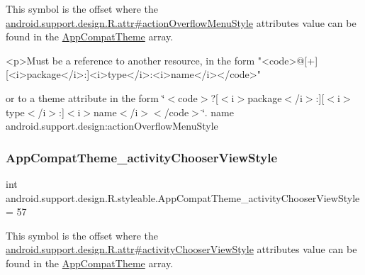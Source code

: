 This symbol is the offset where the \hyperlink{classandroid_1_1support_1_1design_1_1R_1_1attr_a58c4106985af115965681fc784e511f3}{android.\+support.\+design.\+R.\+attr\#action\+Overflow\+Menu\+Style} attribute\textquotesingle{}s value can be found in the \hyperlink{classandroid_1_1support_1_1design_1_1R_1_1styleable_afb351dc8de20cbd4c89abe360373010c}{App\+Compat\+Theme} array.

\begin{DoxyVerb}      <p>Must be a reference to another resource, in the form "<code>@[+][<i>package</i>:]<i>type</i>:<i>name</i></code>"
\end{DoxyVerb}
 or to a theme attribute in the form \char`\"{}$<$code$>$?\mbox{[}$<$i$>$package$<$/i$>$\+:\mbox{]}\mbox{[}$<$i$>$type$<$/i$>$\+:\mbox{]}$<$i$>$name$<$/i$>$$<$/code$>$\char`\"{}.  name android.\+support.\+design\+:action\+Overflow\+Menu\+Style \mbox{\label{classandroid_1_1support_1_1design_1_1R_1_1styleable_acf223883bba2bd20dfcd85b3817e5c51}} 
\subsubsection{\texorpdfstring{App\+Compat\+Theme\+\_\+activity\+Chooser\+View\+Style}{AppCompatTheme\_activityChooserViewStyle}}
{\footnotesize\ttfamily int android.\+support.\+design.\+R.\+styleable.\+App\+Compat\+Theme\+\_\+activity\+Chooser\+View\+Style = 57\hspace{0.3cm}{\ttfamily [static]}}

This symbol is the offset where the \hyperlink{classandroid_1_1support_1_1design_1_1R_1_1attr_a1fd291fa96a1945e4080966723e44cef}{android.\+support.\+design.\+R.\+attr\#activity\+Chooser\+View\+Style} attribute\textquotesingle{}s value can be found in the \hyperlink{classandroid_1_1support_1_1design_1_1R_1_1styleable_afb351dc8de20cbd4c89abe360373010c}{App\+Compat\+Theme} array.

